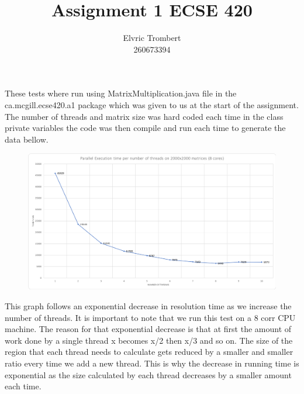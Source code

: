 \documentclass[11pt,letterpaper]{exam}
\author{Elvric Trombert\\260673394}%
\title{Assignment 1 ECSE 420}
\begin{document}
	\maketitle
	\hrulefill
	\begin{questions}
		\question
			These tests where run using MatrixMultiplication.java file in the ca.mcgill.ecse420.a1 package which was given to us at the start of the assignment. The number of threads and matrix size was hard coded each time in the class private variables the code was then compile and run each time to generate the data bellow.
			\begin{figure}[h!]
				\centering
				\includegraphics[scale=0.5]{ExecutionTimeThread}
			\end{figure}
		
			This graph follows an exponential decrease in resolution time as we increase the number of threads. It is important to note that we run this test on a 8 corr CPU machine. The reason for that exponential decrease is that at first the amount of work done by a single thread x becomes x/2 then x/3 and so on. The size of the region that each thread needs to calculate gets reduced by a smaller and smaller ratio every time we add a new thread. This is why the decrease in running time is exponential as the size calculated by each thread decreases by a smaller amount each time.
			

\end{questions}
\end{document}
